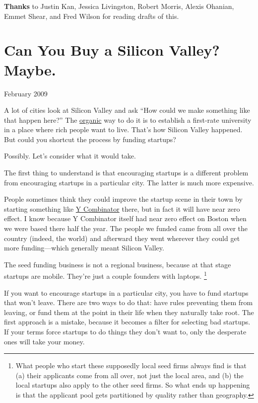\documentclass[12pt]{book}
\begin{document}
\textbf{Thanks} to Justin Kan, Jessica Livingston, Robert Morris, Alexis
Ohanian, Emmet Shear, and Fred Wilson for reading drafts of this.
\chapter{Can You Buy a Silicon Valley?  Maybe.}

February 2009

A lot of cities look at Silicon Valley and ask ``How could we make
something like that happen here?'' The
\href{siliconvalley.html}{organic} way to do it is to establish a
first-rate university in a place where rich people want to live. That's
how Silicon Valley happened. But could you shortcut the process by
funding startups?

Possibly. Let's consider what it would take.

The first thing to understand is that encouraging startups is a
different problem from encouraging startups in a particular city. The
latter is much more expensive.

People sometimes think they could improve the startup scene in their
town by starting something like \href{http://ycombinator.com}{Y
Combinator} there, but in fact it will have near zero effect. I know
because Y Combinator itself had near zero effect on Boston when we were
based there half the year. The people we funded came from all over the
country (indeed, the world) and afterward they went wherever they could
get more funding---which generally meant Silicon Valley.

The seed funding business is not a regional business, because at that
stage startups are mobile. They're just a couple founders with laptops.
\footnote{What people who start these supposedly local seed firms always
find is that (a) their applicants come from all over, not just the local
area, and (b) the local startups also apply to the other seed firms. So
what ends up happening is that the applicant pool gets partitioned by
quality rather than geography.}

If you want to encourage startups in a particular city, you have to fund
startups that won't leave. There are two ways to do that: have rules
preventing them from leaving, or fund them at the point in their life
when they naturally take root. The first approach is a mistake, because
it becomes a filter for selecting bad startups. If your terms force
startups to do things they don't want to, only the desperate ones will
take your money.
\end{document}
